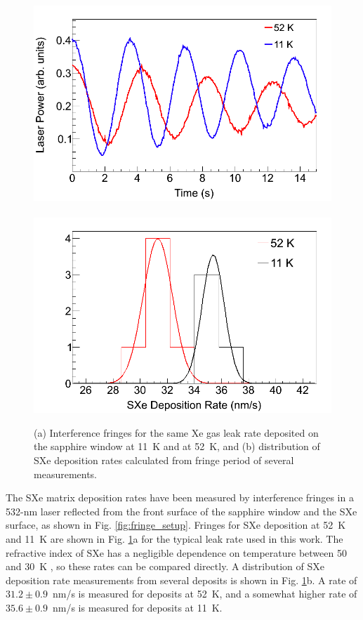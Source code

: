 \begin{figure} %
        \centering
                \includegraphics[width=.5\textwidth]{figures/fringes_52K_vs_11K.png}
                ~
                \includegraphics[width=.5\textwidth]{figures/fringes_52K_vs_11K_statistics.png}
                \caption{(a) Interference fringes for the same Xe gas leak rate deposited on the sapphire window at 11~K and at 52~K, and (b) distribution of SXe deposition rates calculated from fringe period of several measurements.}
\label{fig:fringes_52K_vs_11K}
\end{figure}

The SXe matrix deposition rates have been measured by interference fringes in a 532-nm laser reflected from the front surface of the sapphire window and the SXe surface, as shown in Fig. \ref{fig:fringe_setup}.  Fringes for SXe deposition at 52~K and 11~K are shown in Fig. \ref{fig:fringes_52K_vs_11K}a for the typical leak rate used in this work.  The refractive index of SXe has a negligible dependence on temperature between 50~ and 30~K \cite{SXeIndex}, so these rates can be compared directly.  A distribution of SXe deposition rate measurements from several deposits is shown in Fig. \ref{fig:fringes_52K_vs_11K}b.  A rate of $31.2 \pm 0.9$~nm/s is measured for deposits at 52~K, and a somewhat higher rate of $35.6 \pm 0.9$~nm/s is measured for deposits at 11~K.


